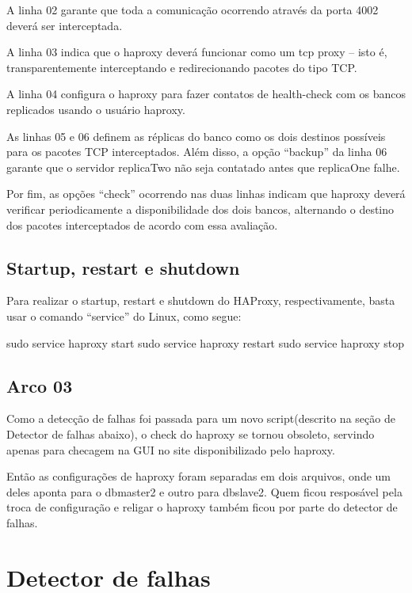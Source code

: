 \documentclass[a4paper,10pt]{article}
\begin{document}
        A linha 02 garante que toda a comunicação ocorrendo através da porta 4002 deverá ser interceptada.

        A linha 03 indica  que o haproxy deverá funcionar como um tcp proxy – isto é, transparentemente interceptando e redirecionando pacotes do tipo TCP.

        A linha 04 configura o haproxy para fazer contatos de health-check com os bancos replicados usando o usuário haproxy.

        As linhas 05 e 06 definem as réplicas do banco como os dois destinos possíveis para os pacotes TCP interceptados. Além disso, a opção “backup” da linha 06 garante que o servidor replicaTwo não seja contatado antes que replicaOne falhe.

        Por fim, as opções “check” ocorrendo nas duas linhas indicam que haproxy deverá verificar periodicamente a disponibilidade dos dois bancos, alternando o destino dos pacotes interceptados de acordo com essa avaliação.

    \subsection{Startup, restart e shutdown}

        Para realizar o startup, restart e shutdown do HAProxy, respectivamente, basta usar o comando “service” do Linux, como segue:

        \begin{spverbatim}
        sudo service haproxy start
        sudo service haproxy restart
        sudo service haproxy stop
        \end{spverbatim}

    \subsection{Arco 03}

    Como a detecção de falhas foi passada para um novo script(descrito na seção de Detector de falhas abaixo), o check do haproxy se tornou obsoleto, servindo apenas para checagem na GUI no site disponibilizado pelo haproxy.

Então as configurações de haproxy foram separadas em dois arquivos, onde um deles aponta para o dbmaster2 e outro para dbslave2. Quem ficou resposável pela troca de configuração e religar o haproxy também ficou por parte do detector de falhas.


\section{Detector de falhas}
\end{document}
